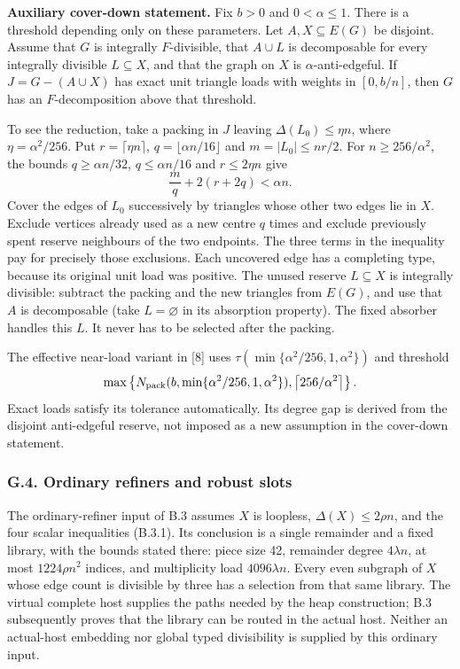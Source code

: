 \documentclass[english,11pt,a4paper]{article}
\begin{document}
\textbf{Auxiliary cover-down statement.} Fix \(b>0\) and \(0<\alpha\le1\). There is a threshold depending only on these parameters. Let \(A,X\subseteq E(G)\) be disjoint. Assume that \(G\) is integrally \(F\)-divisible, that \(A\cup L\) is decomposable for every integrally divisible \(L\subseteq X\), and that the graph on \(X\) is \(\alpha\)-anti-edgeful. If \(J=G-(A\cup X)\) has exact unit triangle loads with weights in \([0,b/n]\), then \(G\) has an \(F\)-decomposition above that threshold.

To see the reduction, take a packing in \(J\) leaving \(\Delta(L_0)\le\eta n\), where \(\eta=\alpha^2/256\). Put \(r=\lceil\eta n\rceil\), \(q=\lfloor\alpha n/16\rfloor\) and \(m=|L_0|\le nr/2\). For \(n\ge256/\alpha^2\), the bounds \(q\ge\alpha n/32\), \(q\le\alpha n/16\) and \(r\le2\eta n\) give \[\frac m q+2(r+2q)<\alpha n.\] Cover the edges of \(L_0\) successively by triangles whose other two edges lie in \(X\). Exclude vertices already used as a new centre \(q\) times and exclude previously spent reserve neighbours of the two endpoints. The three terms in the inequality pay for precisely those exclusions. Each uncovered edge has a completing type, because its original unit load was positive. The unused reserve \(L\subseteq X\) is integrally divisible: subtract the packing and the new triangles from \(E(G)\), and use that \(A\) is decomposable (take \(L=\varnothing\) in its absorption property). The fixed absorber handles this \(L\). It never has to be selected after the packing.

The effective near-load variant in {[}8{]} uses \(\tau(\min\{\alpha^2/256,1,\alpha^2\})\) and threshold \[\max\left\{N_{\rm pack}(b,\min\{\alpha^2/256,1,\alpha^2\}),
\left\lceil256/\alpha^2\right\rceil\right\}.\] Exact loads satisfy its tolerance automatically. Its degree gap is derived from the disjoint anti-edgeful reserve, not imposed as a new assumption in the cover-down statement.

\subsubsection{G.4. Ordinary refiners and robust slots}\label{g.4.-ordinary-refiners-and-robust-slots}

The ordinary-refiner input of B.3 assumes \(X\) is loopless, \(\Delta(X)\le2\rho n\), and the four scalar inequalities (B.3.1). Its conclusion is a single remainder and a fixed library, with the bounds stated there: piece size 42, remainder degree \(4\lambda n\), at most \(1224\rho n^2\) indices, and multiplicity load \(4096\lambda n\). Every even subgraph of \(X\) whose edge count is divisible by three has a selection from that same library. The virtual complete host supplies the paths needed by the heap construction; B.3 subsequently proves that the library can be routed in the actual host. Neither an actual-host embedding nor global typed divisibility is supplied by this ordinary input.
\end{document}
